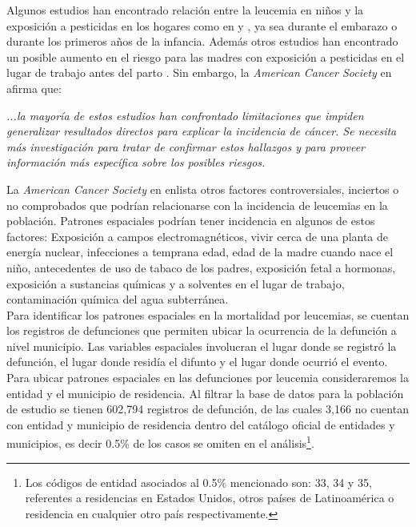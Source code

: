 \documentclass[11pt, oneside]{book}
\begin{document}
Algunos estudios han encontrado relación entre la leucemia en niños y la exposición a pesticidas en los hogares como en \cite{turner} y \cite{monge}, ya sea durante el embarazo o durante los primeros años de la infancia. Además otros estudios han encontrado un posible aumento en el riesgo para las madres con exposición a pesticidas en el lugar de trabajo antes del parto \cite{kumar}. Sin embargo, la \emph{American Cancer Society} en \cite{cancer} afirma que:

\begin{center}
	\emph{...la mayoría de estos estudios han confrontado limitaciones que impiden generalizar resultados directos para explicar la incidencia de cáncer. Se necesita más investigación para tratar de confirmar estos hallazgos y para proveer información más específica sobre los posibles riesgos.}
\end{center}	

La \emph{American Cancer Society} en \cite{cancer} enlista otros factores controversiales, inciertos o no comprobados que podrían relacionarse con la incidencia de leucemias en la población. Patrones espaciales podrían tener incidencia en algunos de estos factores: Exposición a campos electromagnéticos, vivir cerca de una planta de energía nuclear, infecciones a temprana edad, edad de la madre cuando nace el niño, antecedentes de uso de tabaco de los padres, exposición fetal a hormonas, exposición a sustancias químicas y a solventes en el lugar de trabajo, contaminación química del agua subterránea.\\

Para identificar los patrones espaciales en la mortalidad por leucemias, se cuentan los registros de defunciones que permiten ubicar la ocurrencia de la defunción a nivel municipio. Las variables espaciales involucran el lugar donde se registró la defunción, el lugar donde residía el difunto y el lugar donde ocurrió el evento.\\

Para ubicar patrones espaciales en las defunciones por leucemia consideraremos la entidad y el municipio de residencia. Al filtrar la base de datos para la población de estudio se tienen 602,794 registros de defunción, de las cuales 3,166 no cuentan con entidad y municipio de residencia dentro del catálogo oficial de entidades y municipios, es decir 0.5\% de los casos se omiten en el análisis\footnote{Los códigos de entidad asociados al 0.5\% mencionado son: 33, 34 y 35, referentes a residencias en Estados Unidos, otros países de Latinoamérica o residencia en cualquier otro país respectivamente.}.\\
\end{document}
